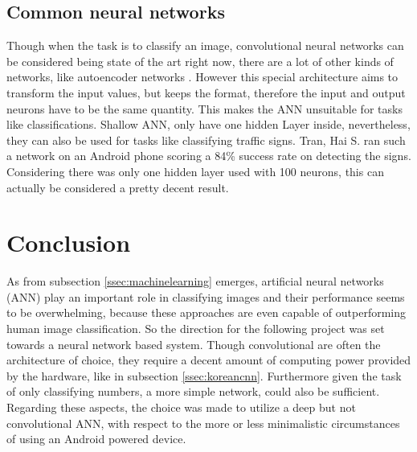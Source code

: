 \subsection{Common neural networks}
Though when the task is to classify an image, convolutional neural networks can be considered being state of the art right now, there are a lot of other kinds of networks, like autoencoder networks \cite{bengio}. However this special architecture aims to transform the input values, but keeps the format, therefore the input and output neurons have to be the same quantity. This makes the ANN unsuitable for tasks like classifications.\newline
Shallow ANN, only have one hidden Layer inside, nevertheless, they can also be used for tasks like classifying traffic signs. Tran, Hai S. ran such a network on an Android phone scoring a 84\% success rate on detecting the signs\cite{tran}. Considering there was only one hidden layer used with 100 neurons, this can actually be considered a pretty decent result.

\newpage
\section{Conclusion}
As from subsection \ref{ssec:machinelearning} emerges, artificial neural networks (ANN) play an important role in classifying images and their performance seems to be overwhelming, because these approaches are even capable of outperforming human image classification. So the direction for the following project was set towards a neural network based system. Though convolutional are often the architecture of choice, they require a decent amount of computing power provided by the hardware, like in subsection \ref{ssec:koreancnn}. Furthermore given the task of only classifying numbers, a more simple network, could also be sufficient. Regarding these aspects, the choice was made to utilize a deep but not convolutional ANN, with respect to the more or less minimalistic circumstances of using an Android powered device.
